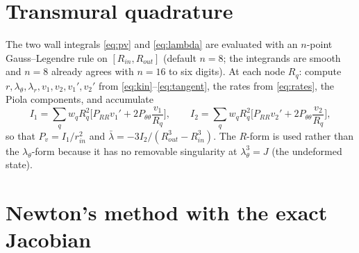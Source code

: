 \documentclass[11pt,a4paper]{article}
\newcommand{\Rin}{R_{in}}
\newcommand{\Rout}{R_{out}}
\newcommand{\rin}{r_{in}}
\newcommand{\lt}{\lambda_\theta}
\newcommand{\lr}{\lambda_r}
\newcommand{\lb}{\bar\lambda}
\begin{document}
\section{Transmural quadrature}

The two wall integrals \eqref{eq:pv} and \eqref{eq:lambda} are evaluated with an $n$-point Gauss--Legendre rule on $[\Rin,\Rout]$ (default $n=8$; the integrands are smooth and $n=8$ already agrees with $n=16$ to six digits). At each node $R_q$: compute $r,\lt,\lr,v_1,v_2,v_1',v_2'$ from \eqref{eq:kin}--\eqref{eq:tangent}, the rates from \eqref{eq:rates}, the Piola components, and accumulate
\[
I_1=\sum_q w_q R_q^2\Big[P_{RR}v_1'+2P_{\theta\theta}\frac{v_1}{R_q}\Big],\qquad
I_2=\sum_q w_q R_q^2\Big[P_{RR}v_2'+2P_{\theta\theta}\frac{v_2}{R_q}\Big],
\]
so that $P_v=I_1/\rin^2$ and $\lb=-3I_2/(\Rout^3-\Rin^3)$. The $R$-form is used rather than the $\lt$-form because it has no removable singularity at $\lt^3=J$ (the undeformed state).

\section{Newton's method with the exact Jacobian}
\end{document}
